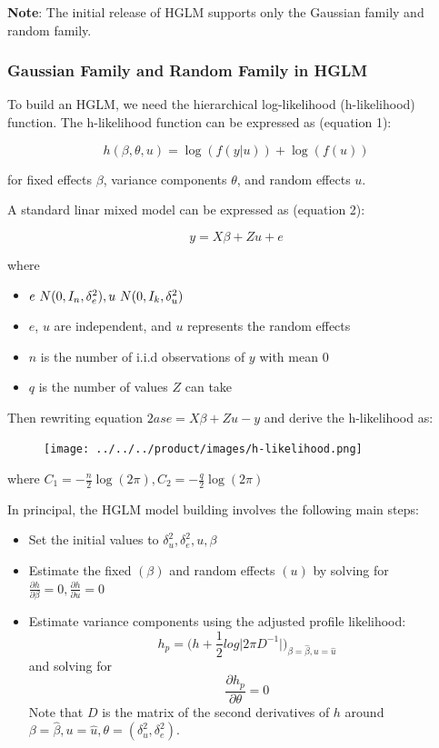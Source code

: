 \textbf{Note}: The initial release of HGLM supports only the Gaussian family and random family.

\subsubsection{Gaussian Family and Random Family in HGLM}

To build an HGLM, we need the hierarchical log-likelihood (h-likelihood) function. The h-likelihood function can be expressed as (equation 1):

$$h(\beta, \theta, u) = \log(f (y|u)) + \log (f(u))$$

for fixed effects $\beta$, variance components $\theta$, and random effects $u$.

A standard linar mixed model can be expressed as (equation 2):

$$y = X\beta + Zu + e$$

where

    \begin{itemize}
    \item  $e \text ~ N(0, I_n, \delta_e^2), u \text ~ N(0, I_k, \delta_u^2)$
    \item  $e$, $u$ are independent, and $u$ represents the random effects
    \item $n$ is the number of i.i.d observations of $y$ with mean $0$
    \item $q$ is the number of values $Z$ can take
    \end{itemize}
    
Then rewriting equation $2 as e = X\beta + Zu - y$ and derive the h-likelihood as:

\begin{figure}[H]
\centering
\texttt{[image: ../../../product/images/h-likelihood.png]}
\end{figure}

where $C_1 = - \frac{n}{2} \log(2\pi), C_2 = - \frac{q}{2} \log(2\pi)$

In principal, the HGLM model building involves the following main steps:

\begin{itemize}
    \item Set the initial values to $\delta_u^2, \delta_e^2, u, \beta$
    \item Estimate the fixed $(\beta)$ and random effects $(u)$ by solving for $\frac{\partial h}{\partial \beta} = 0, \frac{\partial h}{\partial u} = 0$
    \item Estimate variance components using the adjusted profile likelihood:
        $$h_p = \big(h + \frac{1}{2} log \big| 2 \pi D^{-1}\big| \big)_{\beta=\hat \beta, u=\hat u}$$
        and solving for
        $$\frac{\partial h_p}{\partial \theta} = 0$$
        Note that $D$ is the matrix of the second derivatives of $h$ around $\beta = \hat \beta, u = \hat u, \theta = (\delta_u^2, \delta_e^2)$.  
\end{itemize}

